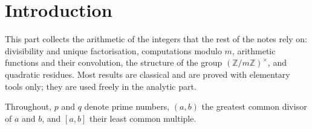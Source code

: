 \chapter*{Introduction}
This part collects the arithmetic of the integers that the rest of the notes rely on: divisibility and unique factorisation, computations modulo $m$, arithmetic functions and their convolution, the structure of the group $(\mathbb{Z}/m\mathbb{Z})^\times$, and quadratic residues. Most results are classical and are proved with elementary tools only; they are used freely in the analytic part.

Throughout, $p$ and $q$ denote prime numbers, $(a,b)$ the greatest common divisor of $a$ and $b$, and $[a,b]$ their least common multiple.






